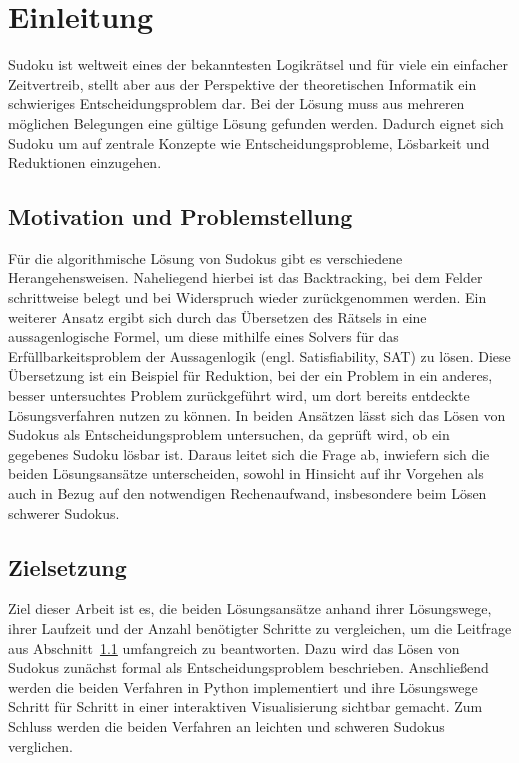 \section{Einleitung}\label{sec:einleitung}
Sudoku ist weltweit eines der bekanntesten Logikrätsel und für viele ein einfacher Zeitvertreib, stellt aber aus der Perspektive der theoretischen Informatik ein schwieriges Entscheidungsproblem dar. Bei der Lösung muss aus mehreren möglichen Belegungen eine gültige Lösung gefunden werden. Dadurch eignet sich Sudoku um auf zentrale Konzepte wie Entscheidungsprobleme, Lösbarkeit und Reduktionen einzugehen. 

\subsection{Motivation und Problemstellung}\label{sec:motivation}

Für die algorithmische Lösung von Sudokus gibt es verschiedene Herangehensweisen. Naheliegend hierbei ist das Backtracking, bei dem Felder schrittweise belegt und bei Widerspruch wieder zurückgenommen werden. Ein weiterer Ansatz ergibt sich durch das Übersetzen des Rätsels in eine aussagenlogische Formel, um diese mithilfe eines Solvers für das Erfüllbarkeitsproblem der Aussagenlogik (engl. Satisfiability, \acs{SAT}) zu lösen. Diese Übersetzung ist ein Beispiel für Reduktion, bei der ein Problem in ein anderes, besser untersuchtes Problem zurückgeführt wird, um dort bereits entdeckte Lösungsverfahren nutzen zu können. In beiden Ansätzen lässt sich das Lösen von Sudokus als Entscheidungsproblem untersuchen, da geprüft wird, ob ein gegebenes Sudoku lösbar ist.
Daraus leitet sich die Frage ab, inwiefern sich die beiden Lösungsansätze unterscheiden, sowohl in Hinsicht auf ihr Vorgehen als auch in Bezug auf den notwendigen Rechenaufwand, insbesondere beim Lösen schwerer Sudokus.

\subsection{Zielsetzung}\label{sec:zielsetzung}

Ziel dieser Arbeit ist es, die beiden Lösungsansätze anhand ihrer Lösungswege, ihrer Laufzeit und der Anzahl benötigter Schritte zu vergleichen, um die Leitfrage aus Abschnitt~\ref{sec:motivation} umfangreich zu beantworten. Dazu wird das Lösen von Sudokus zunächst formal als Entscheidungsproblem beschrieben. Anschließend werden die beiden Verfahren in Python implementiert und ihre Lösungswege Schritt für Schritt in einer interaktiven Visualisierung sichtbar gemacht. Zum Schluss werden die beiden Verfahren an leichten und schweren Sudokus verglichen.


